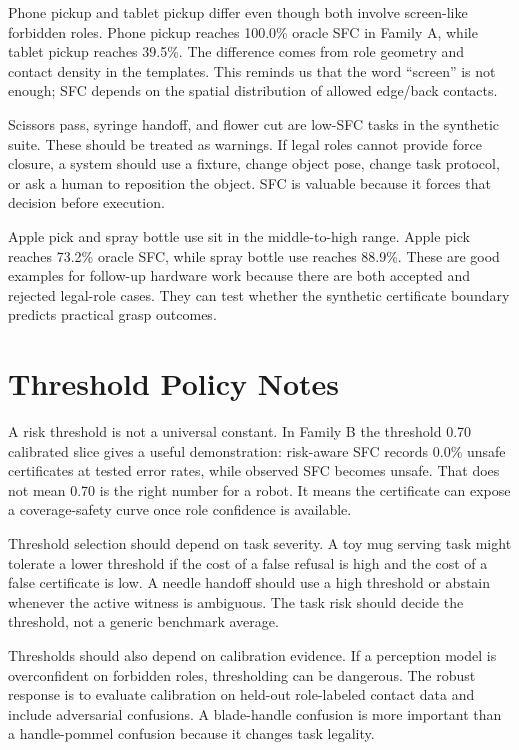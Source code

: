 \documentclass{article}
\begin{document}
Phone pickup and tablet pickup differ even though both involve screen-like forbidden roles. Phone pickup reaches 100.0\% oracle SFC in Family A, while tablet pickup reaches 39.5\%. The difference comes from role geometry and contact density in the templates. This reminds us that the word ``screen'' is not enough; SFC depends on the spatial distribution of allowed edge/back contacts.

Scissors pass, syringe handoff, and flower cut are low-SFC tasks in the synthetic suite. These should be treated as warnings. If legal roles cannot provide force closure, a system should use a fixture, change object pose, change task protocol, or ask a human to reposition the object. SFC is valuable because it forces that decision before execution.

Apple pick and spray bottle use sit in the middle-to-high range. Apple pick reaches 73.2\% oracle SFC, while spray bottle use reaches 88.9\%. These are good examples for follow-up hardware work because there are both accepted and rejected legal-role cases. They can test whether the synthetic certificate boundary predicts practical grasp outcomes.

\section{Threshold Policy Notes}

A risk threshold is not a universal constant. In Family B the threshold 0.70 calibrated slice gives a useful demonstration: risk-aware SFC records 0.0\% unsafe certificates at tested error rates, while observed SFC becomes unsafe. That does not mean 0.70 is the right number for a robot. It means the certificate can expose a coverage-safety curve once role confidence is available.

Threshold selection should depend on task severity. A toy mug serving task might tolerate a lower threshold if the cost of a false refusal is high and the cost of a false certificate is low. A needle handoff should use a high threshold or abstain whenever the active witness is ambiguous. The task risk should decide the threshold, not a generic benchmark average.

Thresholds should also depend on calibration evidence. If a perception model is overconfident on forbidden roles, thresholding can be dangerous. The robust response is to evaluate calibration on held-out role-labeled contact data and include adversarial confusions. A blade-handle confusion is more important than a handle-pommel confusion because it changes task legality.
\end{document}

